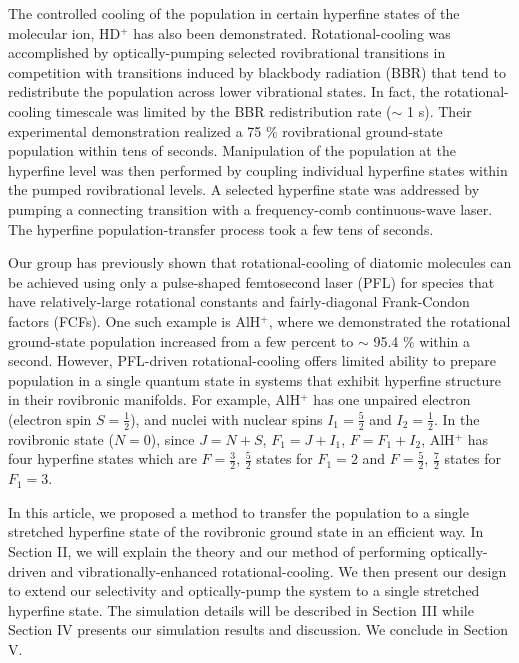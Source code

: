 \documentclass[nofootinbib,aip,jcp,reprint]{revtex4-1}
\begin{document}
The controlled cooling of the population in certain hyperfine states of the molecular ion, HD$^+$ has also been demonstrated\cite{bressel2012manipulation}. Rotational-cooling was accomplished by optically-pumping selected rovibrational transitions in competition with transitions induced by blackbody radiation (BBR) that tend to redistribute the population across lower vibrational states\cite{schneider2010all}. In fact, the rotational-cooling timescale was limited by the BBR redistribution rate ($\sim$ 1 s). Their experimental demonstration realized a 75 $\%$ rovibrational ground-state population within tens of seconds. Manipulation of the population at the hyperfine level was then performed by coupling individual hyperfine states within the pumped rovibrational levels. A selected hyperfine state was addressed by pumping a connecting transition with a frequency-comb continuous-wave laser. The hyperfine population-transfer process took a few tens of seconds.\par
Our group has previously shown that rotational-cooling of diatomic molecules can be achieved using only a pulse-shaped femtosecond laser (PFL) for species that have relatively-large rotational constants and fairly-diagonal Frank-Condon factors (FCFs)\cite{lien2011optical}. One such example is AlH$^+$, where we demonstrated the rotational ground-state population increased from a few percent to $\sim$ 95.4 $\%$ within a second.\cite{lien2014broadband} However, PFL-driven rotational-cooling offers limited ability to prepare population in a single quantum state in systems that exhibit hyperfine structure in their rovibronic manifolds. For example, AlH$^+$ has one unpaired electron (electron spin $S=\frac{1}{2}$), and nuclei with nuclear spins $I_{1}=\frac{5}{2}$ and $I_{2}=\frac{1}{2}$. In the rovibronic state ($N=0$), since $J=N+S$, $F_{1}=J+I_{1}$, $F=F_{1}+I_{2}$, AlH$^{+}$ has four hyperfine states which are $F=\frac{3}{2},\, \frac{5}{2}$ states for $F_{1}=2$ and $F=\frac{5}{2},\, \frac{7}{2}$ states for $F_{1}=3$.\par
In this article, we proposed a method to transfer the population to a single stretched hyperfine state of the rovibronic ground state in an efficient way. In Section II, we will explain the theory and our method of performing optically-driven and vibrationally-enhanced rotational-cooling. We then present our design to extend our selectivity and optically-pump the system to a single stretched hyperfine state. The simulation details will be described in Section III while Section IV presents our simulation results and discussion. We conclude in Section V.\par
\end{document}
